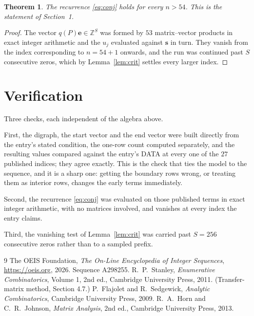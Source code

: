 \documentclass[11pt,a4paper]{article}
\theoremstyle{plain}
\newtheorem{theorem}{Theorem}
\theoremstyle{definition}
\begin{document}
\begin{theorem}
The recurrence \eqref{eq:conj} holds for every $n>54$. This is the statement of
Section~1.
\end{theorem}

\begin{proof}
The vector $q(P)\mathbf{e}\in\mathbb{Z}^{S}$ was formed by $53$ matrix--vector
products in exact integer arithmetic and the $u_j$ evaluated against $\mathbf{s}$ in turn.
They vanish from the index corresponding to $n=54+1$ onwards, and the run was continued
past $S$ consecutive zeros, which by Lemma~\ref{lem:crit} settles every larger index.
\end{proof}

\section{Verification}

Three checks, each independent of the algebra above.

First, the digraph, the start vector and the end vector were built directly from the
entry's stated condition, the one-row count computed separately, and the resulting values
compared against the entry's DATA at every one of the $27$ published indices; they
agree exactly. This is the check that ties the model to the sequence, and it is a sharp one:
getting the boundary rows wrong, or treating them as interior rows, changes the early terms
immediately.

Second, the recurrence \eqref{eq:conj} was evaluated on those published terms in exact
integer arithmetic, with no matrices involved, and vanishes at every index the entry claims.

Third, the vanishing test of Lemma~\ref{lem:crit} was carried past $S=256$ consecutive
zeros rather than to a sampled prefix.

\begin{thebibliography}{9}
 The OEIS Foundation, \emph{The On-Line Encyclopedia of Integer
Sequences}, \url{https://oeis.org}, 2026. Sequence A298255.
 R.~P.~Stanley, \emph{Enumerative Combinatorics}, Volume 1, 2nd ed.,
Cambridge University Press, 2011. (Transfer-matrix method, Section 4.7.)
 P.~Flajolet and R.~Sedgewick, \emph{Analytic Combinatorics}, Cambridge
University Press, 2009.
 R.~A.~Horn and C.~R.~Johnson, \emph{Matrix Analysis}, 2nd ed., Cambridge
University Press, 2013.
\end{thebibliography}
\end{document}
